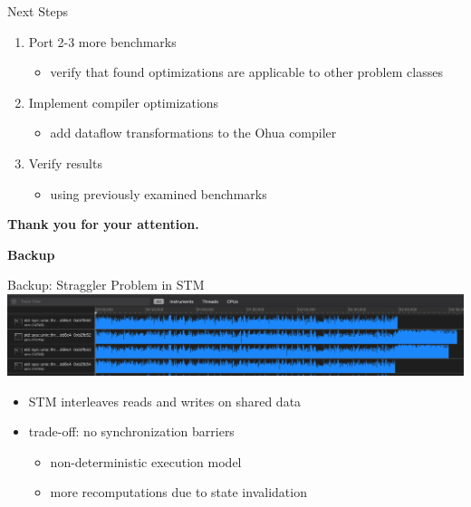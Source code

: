 \documentclass[aspectratio=169, usenames, dvipsnames]{beamer}
\begin{document}
\begin{frame}{Next Steps}
  \begin{enumerate}
    \item Port 2-3 more benchmarks
    \begin{itemize}
      \item verify that found optimizations are applicable to other problem classes\\[1.2\baselineskip]
    \end{itemize}
    \item<2-> Implement compiler optimizations
    \begin{itemize}
      \item<2-> add dataflow transformations to the Ohua compiler\\[1.2\baselineskip]
    \end{itemize}
    \item<3-> Verify results
    \begin{itemize}
      \item<3-> using previously examined benchmarks
    \end{itemize}
  \end{enumerate}
\end{frame}

\begin{frame}
  \centering
  \huge
  \alert{\textbf{Thank you for your attention.}}
\end{frame}


\begin{frame}
  \centering
  \huge
  \alert{\textbf{Backup}}
\end{frame}

\begin{frame}{Backup: Straggler Problem in STM}
  \includegraphics[width=\textwidth,keepaspectratio]{img/cpu_load_stm.png}
  
  \vfill
  \begin{itemize}
    \item<2-> STM interleaves reads and writes on shared data
    \item<3-> trade-off: no synchronization barriers \\[.55\baselineskip]
    \begin{itemize}
      \item<4-> non-deterministic execution model
      \item<4-> more recomputations due to state invalidation
    \end{itemize}
  \end{itemize}
\end{frame}
\end{document}
